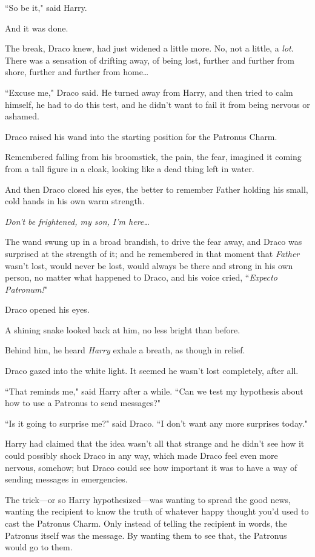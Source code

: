 ``So be it," said Harry.

And it was done.

The break, Draco knew, had just widened a little more. No, not a little, a \emph{lot}. There was a sensation of drifting away, of being lost, further and further from shore, further and further from home{\ldots}

``Excuse me," Draco said. He turned away from Harry, and then tried to calm himself, he had to do this test, and he didn't want to fail it from being nervous or ashamed.

Draco raised his wand into the starting position for the Patronus Charm.

Remembered falling from his broomstick, the pain, the fear, imagined it coming from a tall figure in a cloak, looking like a dead thing left in water.

And then Draco closed his eyes, the better to remember Father holding his small, cold hands in his own warm strength.

\emph{Don't be frightened, my son, I'm here{\ldots}}

The wand swung up in a broad brandish, to drive the fear away, and Draco was surprised at the strength of it; and he remembered in that moment that \emph{Father} wasn't lost, would never be lost, would always be there and strong in his own person, no matter what happened to Draco, and his voice cried, ``\emph{Expecto Patronum!}"

Draco opened his eyes.

A shining snake looked back at him, no less bright than before.

Behind him, he heard \emph{Harry} exhale a breath, as though in relief.

Draco gazed into the white light. It seemed he wasn't lost completely, after all.

``That reminds me," said Harry after a while. ``Can we test my hypothesis about how to use a Patronus to send messages?"

``Is it going to surprise me?" said Draco. ``I don't want any more surprises today."

\later

Harry had claimed that the idea wasn't all that strange and he didn't see how it could possibly shock Draco in any way, which made Draco feel even more nervous, somehow; but Draco could see how important it was to have a way of sending messages in emergencies.

The trick—or so Harry hypothesized—was wanting to spread the good news, wanting the recipient to know the truth of whatever happy thought you'd used to cast the Patronus Charm. Only instead of telling the recipient in words, the Patronus itself was the message. By wanting them to see that, the Patronus would go to them.

